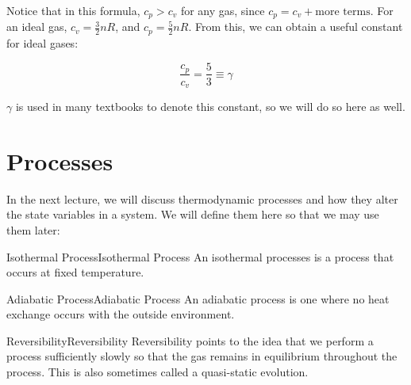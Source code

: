     Notice that in this formula, $c_p > c_v$ for any gas, since $c_p = c_v + \text{more terms}$. For an ideal gas, $c_v = \frac{3}{2} nR$, and $c_p = \frac{5}{2} nR$. From this, we can obtain a useful constant for ideal gases: 

    \[ \frac{c_p}{c_v} = \frac{5}{3} \equiv \gamma\]

    $\gamma$ is used in many textbooks to denote this constant, so we will do so here as well. 


    \section{Processes}

    In the next lecture, we will discuss thermodynamic processes and how they alter the state variables in a system. We will define them here so that we may use them later:

    \begin{definition}{Isothermal Process}{Isothermal Process}
      An isothermal processes is a process that occurs at fixed temperature. 
    \end{definition}


    \begin{definition}{Adiabatic Process}{Adiabatic Process}
      An adiabatic process is one where no heat exchange occurs with the outside environment.
    \end{definition}


    \begin{definition}{Reversibility}{Reversibility}
      Reversibility points to the idea that we perform a process sufficiently slowly so that the gas remains in equilibrium throughout the process. This is also sometimes called a quasi-static evolution.
    \end{definition}
